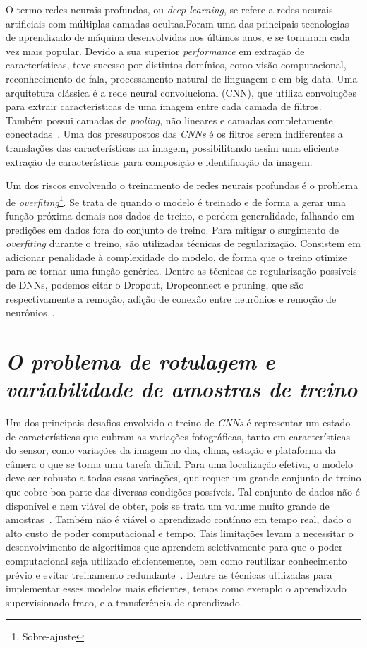 O termo redes neurais profundas, ou \textit{deep learning}, se refere a redes neurais artificiais com múltiplas camadas ocultas.Foram uma das principais tecnologias de aprendizado de máquina desenvolvidas nos últimos anos, e se tornaram cada vez mais popular. Devido a sua superior \textit{performance} em extração de características, teve sucesso por distintos domínios, como visão computacional, reconhecimento de fala, processamento natural de linguagem e em big data. Uma arquitetura clássica é a rede neural convolucional (CNN), que utiliza convoluções para extrair características de uma imagem entre cada camada de filtros. Também possui camadas de \textit{pooling}, não lineares e camadas completamente conectadas~\cite{8308186}. Uma dos pressupostos das \textit{CNNs} é os filtros serem indiferentes a translações das características na imagem, possibilitando assim uma eficiente extração de características para composição e identificação da imagem.

Um dos riscos envolvendo o treinamento de redes neurais profundas é o problema de \textit{overfiting}\footnote{Sobre-ajuste}. Se trata de quando o modelo é treinado e de forma a gerar uma função próxima demais aos dados de treino, e perdem generalidade, falhando em predições em dados fora do conjunto de treino. Para mitigar o surgimento de \textit{overfiting} durante o treino, são utilizadas técnicas de regularização. Consistem em adicionar penalidade à complexidade do modelo, de forma que o treino otimize para se tornar uma função genérica. Dentre as técnicas de regularização possíveis de DNNs, podemos citar o Dropout, Dropconnect e pruning, que são respectivamente a remoção, adição de conexão entre neurônios e remoção de neurônios~\cite{hastie01statisticallearning}.

\section{\textit{O problema de rotulagem e variabilidade de amostras de treino}}\label{sec:Cap2_rotulagem}


Um dos principais desafios envolvido o treino de \textit{CNNs} é representar um estado de características que cubram as variações fotográficas, tanto em características do sensor, como variações da imagem no dia, clima, estação e plataforma da câmera o que se torna uma tarefa difícil. Para uma localização efetiva, o modelo deve ser robusto a todas essas variações, que requer um grande conjunto de treino que cobre boa parte das diversas condições possíveis. Tal conjunto de dados não é disponível e nem viável de obter, pois se trata um volume muito grande de amostras~\cite{rs13194017}. Também não é viável o aprendizado contínuo em tempo real, dado o alto custo de poder computacional e tempo. Tais limitações levam a necessitar o desenvolvimento de algorítimos que aprendem seletivamente para que o poder computacional seja utilizado eficientemente, bem como reutilizar conhecimento prévio e evitar treinamento redundante~\cite{rostami2019learning}.  Dentre as técnicas utilizadas para implementar esses modelos mais eficientes, temos como exemplo o aprendizado supervisionado fraco, e a transferência de aprendizado. 

